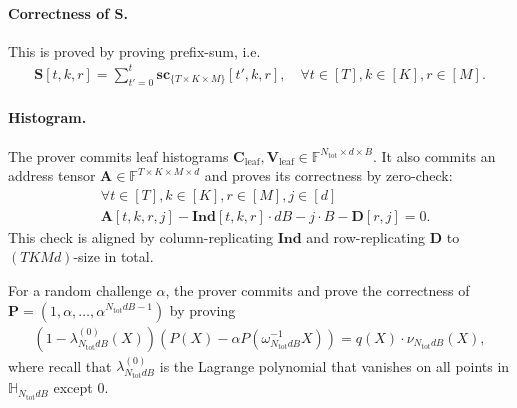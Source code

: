 \paragraph{Correctness of $\mathbf{S}$.}
This is proved by proving prefix-sum, i.e.
\begin{align}
    \mathbf{S}[t,k,r]
    =
    \sum_{t'=0}^{t}\mathbf{sc}_{\{T\times K\times M\}}[t',k,r],
    \quad
    \forall t\in[T], k\in[K], r\in[M].
\end{align}

\paragraph{Histogram.}
The prover commits leaf histograms
$\mathbf{C}_{\mathrm{leaf}},\mathbf{V}_{\mathrm{leaf}}
\in\mathbb{F}^{N_{\mathrm{tot}}\times d\times B}$.
It also commits an address tensor
$\mathbf{A}\in\mathbb{F}^{T\times K\times M\times d}$
and proves its correctness by zero-check:
\begin{align}
    &\forall t\in[T],k\in[K],r\in[M],j\in[d]\nonumber\\
    &\mathbf{A}[t,k,r,j]
    -\mathbf{Ind}[t,k,r]\cdot dB-j\cdot B-\mathbf{D}[r,j]
    =
    0.
\end{align}
This check is aligned by column-replicating $\mathbf{Ind}$ and row-replicating $\mathbf{D}$ to $(TKMd)$-size in total.

For a random challenge $\alpha$, the prover commits and prove
the correctness of $\mathbf{P} = (1, \alpha, \dots, \alpha^{N_{\mathrm{tot}}dB-1})$ by proving
\begin{align}
    \left(1 - \lambda_{N_{\mathrm{tot}}dB}^{(0)}(X)\right) \left(P(X) - \alpha P(\omega^{-1}_{N_{\mathrm{tot}}dB}X)\right) = q(X)\cdot \nu_{N_{\mathrm{tot}}dB}(X),
\end{align}
where recall that $\lambda_{N_{\mathrm{tot}}dB}^{(0)}$ is the Lagrange polynomial that vanishes on all points in $\mathbb{H}_{N_{\mathrm{tot}}dB}$ except $0$.

